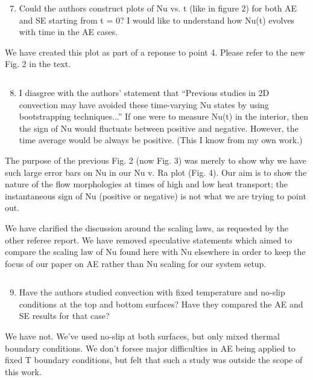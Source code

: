 \documentclass[aps, 11pt, singlecolumn]{revtex4-1} %
\begin{document}
\begin{singlespace}
\begin{myquotation}
$\,$\\\vspace{-1.25cm}
\begin{enumerate}
\setcounter{enumi}{6}
\item Could the authors construct plots of Nu vs. t (like in figure 2) for both AE and SE starting from t = 0? I would like to understand how Nu(t) evolves with time in the AE cases.
\end{enumerate}
\end{myquotation}
We have created this plot as part of a reponse to point 4. Please refer to the
new Fig. 2 in the text.

\begin{myquotation}
$\,$\\\vspace{-1.25cm}
\begin{enumerate}
\setcounter{enumi}{7}
\item I diasgree with the authors’ statement that “Previous studies in 2D convection may have avoided these time-varying Nu states by using bootstrapping techniques...” If one were to measure Nu(t) in the interior, then the sign of Nu would fluctuate between positive and negative. However, the time average would be always be positive. (This I know from my own work.)
\end{enumerate}
\end{myquotation}
The purpose of the previous Fig. 2 (now Fig. 3) was merely to show why we have
such large error bars on Nu in our Nu v. Ra plot (Fig. 4). Our aim is to show
the nature of the flow morphologies at times of high and low heat transport;
the instantaneous sign of Nu (positive or negative) is not what we are trying
to point out.

We have clarified the discussion around the scaling laws, as requested by the
other referee report. We have removed speculative statements which aimed to
compare the scaling law of Nu found here with Nu elsewhere in order to keep
the focus of our paper on AE rather than Nu scaling for our system setup.

\begin{myquotation}
$\,$\\\vspace{-1.25cm}
\begin{enumerate}
\setcounter{enumi}{8}
\item Have the authors studied convection with fixed temperature and no-slip conditions at the top and bottom surfaces? Have they compared the AE and SE results for that case?
\end{enumerate}
\end{myquotation}
We have not. We've used no-slip at both surfaces, 
but only mixed thermal boundary conditions. 
We don't forsee major difficulties in AE being applied to fixed T boundary 
conditions, but felt that such a study was outside the scope of this work.





\end{singlespace}





\end{document}
